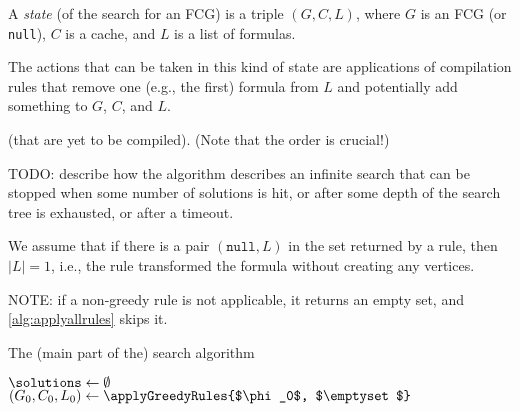
\begin{definition}
  A \emph{state} (of the search for an FCG) is a triple $(G, C, L)$, where $G$ is an FCG (or \texttt{null}), $C$ is a cache, and $L$ is a list of formulas.
\end{definition}


The actions that can be taken in this kind of state are applications of compilation rules that remove one (e.g., the first) formula from $L$ and potentially add something to $G$, $C$, and $L$.


(that are yet to be compiled). (Note that the order is crucial!)

TODO: describe how the algorithm describes an infinite search that can be stopped when some number of solutions is hit, or after some depth of the search tree is exhausted, or after a timeout.


We assume that if there is a pair $(\texttt{null}, L)$ in the set returned by a rule, then $|L| = 1$, i.e., the rule transformed the formula without creating any vertices.

NOTE: if a non-greedy rule is not applicable, it returns an empty set, and \cref{alg:applyallrules} skips it.

\begin{algorithm}
  \caption{The (main part of the) search algorithm}
  \label{alg:search}
  $\solutions \gets \emptyset$\;
  $(G_0, C_0, L_0) \gets \applyGreedyRules{$\phi_0$, $\emptyset$}$\;
\end{algorithm}

